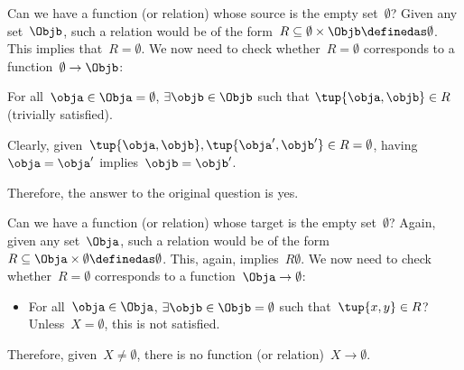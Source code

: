 \begin{example}
  Can we have a function (or relation) whose source is the empty set~$\emptyset$? Given any set~$\Objb$, such a relation would be of the form~$R\subseteq \emptyset \times \Objb \definedas \emptyset$. This implies that~$R=\emptyset$. We now need to check whether~$R=\emptyset$ corresponds to a function~$\emptyset\to \Objb$:
  \begin{compactitem}
    \item For all~$\obja\in \Obja=\emptyset$, $\exists \objb \in \Objb$ such that $\tup{\obja,\objb}\in R$ (trivially satisfied).
    \item Clearly, given~$\tup{\obja,\objb}, \tup{\obja',\objb'}\in R=\emptyset$, having~$\obja=\obja'$ implies~$\objb=\objb'$.
  \end{compactitem}
  Therefore, the answer to the original question is yes.
\end{example}

\begin{example}
  Can we have a function (or relation) whose target is the empty set~$\emptyset$? Again, given any set~$\Obja$, such a relation would be of the form~$R\subseteq \Obja\times \emptyset\definedas \emptyset$. This, again, implies~$R\emptyset$. We now need to check whether~$R=\emptyset$ corresponds to a function~$\Obja \to \emptyset$:
  \begin{itemize}
    \item For all~$\obja\in \Obja$, $\exists \objb\in \Objb=\emptyset$ such that~$\tup{x,y}\in R$? Unless~$X=\emptyset$, this is not satisfied.
  \end{itemize}
  Therefore, given~$X\neq \emptyset$, there is no function (or relation)~$X\to \emptyset$.
\end{example}
